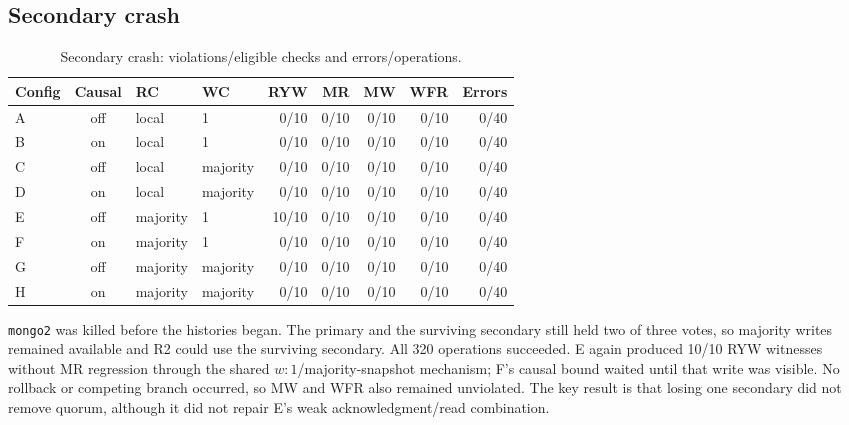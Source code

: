 \documentclass[11pt,a4paper]{article}
\begin{document}
\subsection{Secondary crash}
\begin{table}[H]
\centering\scriptsize
\caption{Secondary crash: violations/eligible checks and errors/operations.}
\begin{tabular}{@{}lcllrrrrr@{}}
\toprule Config & Causal & RC & WC & RYW & MR & MW & WFR & Errors\\ \midrule
A & off & local & 1 & 0/10 & 0/10 & 0/10 & 0/10 & 0/40\\
B & on  & local & 1 & 0/10 & 0/10 & 0/10 & 0/10 & 0/40\\
C & off & local & majority & 0/10 & 0/10 & 0/10 & 0/10 & 0/40\\
D & on  & local & majority & 0/10 & 0/10 & 0/10 & 0/10 & 0/40\\
E & off & majority & 1 & 10/10 & 0/10 & 0/10 & 0/10 & 0/40\\
F & on  & majority & 1 & 0/10 & 0/10 & 0/10 & 0/10 & 0/40\\
G & off & majority & majority & 0/10 & 0/10 & 0/10 & 0/10 & 0/40\\
H & on  & majority & majority & 0/10 & 0/10 & 0/10 & 0/10 & 0/40\\ \bottomrule
\end{tabular}
\end{table}

\texttt{mongo2} was killed before the histories began. The primary and the surviving
secondary still held two of three votes, so majority writes remained available and R2 could
use the surviving secondary. All 320 operations succeeded. E again produced 10/10 RYW
witnesses without MR regression through the shared $w:1$/majority-snapshot mechanism; F's
causal bound waited until that write was visible. No rollback or competing branch occurred,
so MW and WFR also remained unviolated. The key result is that losing one secondary did not
remove quorum, although it did not repair E's weak acknowledgment/read combination.
\FloatBarrier
\end{document}
